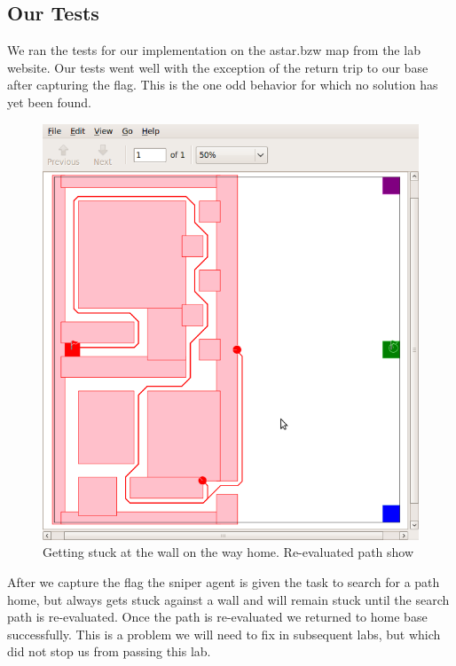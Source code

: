 \subsection{Our Tests}
We ran the tests for our implementation on the astar.bzw map from the lab website. Our tests went well with the exception of the return trip to our base after capturing the flag.  This is the one odd behavior for which no solution has yet been found.
\par
\begin{figure}\label{fig:stuck}
\begin{center}
\includegraphics[width=\textwidth]{07re-evaluate-path.png}
\caption{Getting stuck at the wall on the way home. Re-evaluated path show}
\end{center}
\end{figure}
After we capture the flag the sniper agent is given the task to search for a path home, but always gets stuck against a wall and will remain stuck until the search path is re-evaluated. Once the path is re-evaluated we returned to home base successfully.  This is a problem we will need to fix in subsequent labs, but which did not stop us from passing this lab.

